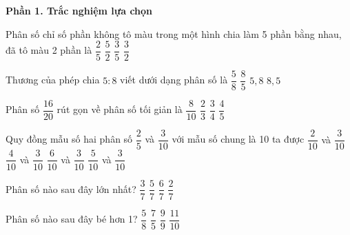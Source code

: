 \textbf{Phần 1. Trắc nghiệm lựa chọn}

\begin{ex} %
Phân số chỉ số phần không tô màu trong một hình chia làm 5 phần bằng nhau, đã tô màu 2 phần là
\choice
{$\dfrac{2}{5}$}
{$\dfrac{5}{2}$}
{\True $\dfrac{3}{5}$}
{$\dfrac{3}{2}$}
\end{ex}

\begin{ex} %
Thương của phép chia $5 : 8$ viết dưới dạng phân số là
\choice
{\True $\dfrac{5}{8}$}
{$\dfrac{8}{5}$}
{$5{,}8$}
{$8{,}5$}
\end{ex}

\begin{ex} %
Phân số $\dfrac{16}{20}$ rút gọn về phân số tối giản là
\choice
{$\dfrac{8}{10}$}
{$\dfrac{2}{3}$}
{$\dfrac{3}{4}$}
{\True $\dfrac{4}{5}$}
\end{ex}

\begin{ex} %
Quy đồng mẫu số hai phân số $\dfrac{2}{5}$ và $\dfrac{3}{10}$ với mẫu số chung là 10 ta được
\choice
{$\dfrac{2}{10}$ và $\dfrac{3}{10}$}
{\True $\dfrac{4}{10}$ và $\dfrac{3}{10}$}
{$\dfrac{6}{10}$ và $\dfrac{3}{10}$}
{$\dfrac{5}{10}$ và $\dfrac{3}{10}$}
\end{ex}

\begin{ex} %
Phân số nào sau đây lớn nhất?
\choice
{$\dfrac{3}{7}$}
{$\dfrac{5}{7}$}
{\True $\dfrac{6}{7}$}
{$\dfrac{2}{7}$}
\end{ex}

\begin{ex} %
Phân số nào sau đây bé hơn 1?
\choice
{\True $\dfrac{5}{8}$}
{$\dfrac{7}{5}$}
{$\dfrac{9}{9}$}
{$\dfrac{11}{10}$}
\end{ex}


